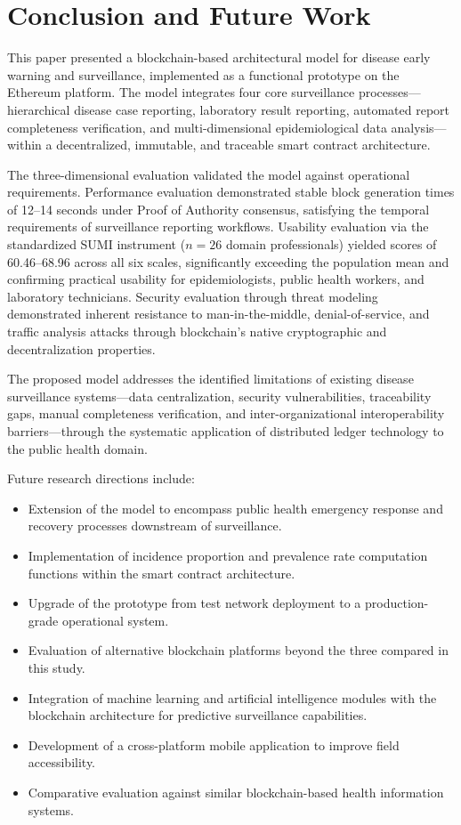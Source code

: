 \section{Conclusion and Future Work}\label{sec:conclusion}

This paper presented a blockchain-based architectural model for disease early warning and surveillance, implemented as a functional prototype on the Ethereum platform. The model integrates four core surveillance processes---hierarchical disease case reporting, laboratory result reporting, automated report completeness verification, and multi-dimensional epidemiological data analysis---within a decentralized, immutable, and traceable smart contract architecture.

The three-dimensional evaluation validated the model against operational requirements. Performance evaluation demonstrated stable block generation times of 12--14 seconds under Proof of Authority consensus, satisfying the temporal requirements of surveillance reporting workflows. Usability evaluation via the standardized SUMI instrument ($n=26$ domain professionals) yielded scores of 60.46--68.96 across all six scales, significantly exceeding the population mean and confirming practical usability for epidemiologists, public health workers, and laboratory technicians. Security evaluation through threat modeling demonstrated inherent resistance to man-in-the-middle, denial-of-service, and traffic analysis attacks through blockchain's native cryptographic and decentralization properties.

The proposed model addresses the identified limitations of existing disease surveillance systems---data centralization, security vulnerabilities, traceability gaps, manual completeness verification, and inter-organizational interoperability barriers---through the systematic application of distributed ledger technology to the public health domain.

Future research directions include:
\begin{itemize}
\item Extension of the model to encompass public health emergency response and recovery processes downstream of surveillance.
\item Implementation of incidence proportion and prevalence rate computation functions within the smart contract architecture.
\item Upgrade of the prototype from test network deployment to a production-grade operational system.
\item Evaluation of alternative blockchain platforms beyond the three compared in this study.
\item Integration of machine learning and artificial intelligence modules with the blockchain architecture for predictive surveillance capabilities.
\item Development of a cross-platform mobile application to improve field accessibility.
\item Comparative evaluation against similar blockchain-based health information systems.
\end{itemize}

